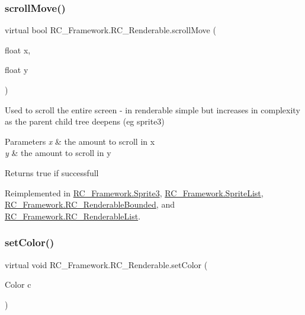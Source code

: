 \subsubsection{\texorpdfstring{scroll\+Move()}{scrollMove()}}
{\footnotesize\ttfamily virtual bool R\+C\+\_\+\+Framework.\+R\+C\+\_\+\+Renderable.\+scroll\+Move (\begin{DoxyParamCaption}\item[{float}]{x,  }\item[{float}]{y }\end{DoxyParamCaption})\hspace{0.3cm}{\ttfamily [virtual]}}



Used to scroll the entire screen -\/ in renderable simple but increases in complexity as the parent child tree deepens (eg sprite3) 


\begin{DoxyParams}{Parameters}
{\em x} & the amount to scroll in x \\
\hline
{\em y} & the amount to scroll in y\\
\hline
\end{DoxyParams}
\begin{DoxyReturn}{Returns}
true if successfull 
\end{DoxyReturn}


Reimplemented in \mbox{\hyperlink{class_r_c___framework_1_1_sprite3_ab4c64556d7bcebf5ce538631ae9b5d6c}{R\+C\+\_\+\+Framework.\+Sprite3}}, \mbox{\hyperlink{class_r_c___framework_1_1_sprite_list_ac4dbeb822b300bdcbebeb20c15b7bc9a}{R\+C\+\_\+\+Framework.\+Sprite\+List}}, \mbox{\hyperlink{class_r_c___framework_1_1_r_c___renderable_bounded_a000dd516577e50fb39fc3e1acc774435}{R\+C\+\_\+\+Framework.\+R\+C\+\_\+\+Renderable\+Bounded}}, and \mbox{\hyperlink{class_r_c___framework_1_1_r_c___renderable_list_ad7238f93a7ad63020771702a2db0ccfe}{R\+C\+\_\+\+Framework.\+R\+C\+\_\+\+Renderable\+List}}.

\mbox{\label{class_r_c___framework_1_1_r_c___renderable_a73bf15681dc31644705e509c53f68833}} 
\subsubsection{\texorpdfstring{set\+Color()}{setColor()}}
{\footnotesize\ttfamily virtual void R\+C\+\_\+\+Framework.\+R\+C\+\_\+\+Renderable.\+set\+Color (\begin{DoxyParamCaption}\item[{Color}]{c }\end{DoxyParamCaption})\hspace{0.3cm}{\ttfamily [virtual]}}



